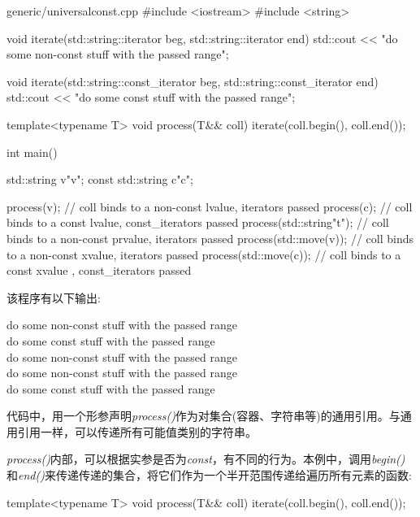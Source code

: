 \begin{codeboxt}[cpp]{generic/universalconst.cpp}
#include <iostream>
#include <string>

void iterate(std::string::iterator beg, std::string::iterator end)
{
  std::cout << "do some non-const stuff with the passed range\n";
}

void iterate(std::string::const_iterator beg, std::string::const_iterator end)
{
  std::cout << "do some const stuff with the passed range\n";
}

template<typename T>
void process(T&& coll)
{
  iterate(coll.begin(), coll.end());
}

int main()
{
  std::string v{"v"};
  const std::string c{"c"};

  process(v); // coll binds to a non-const lvalue, iterators passed
  process(c); // coll binds to a const lvalue, const_iterators passed
  process(std::string{"t"}); // coll binds to a non-const prvalue, iterators passed
  process(std::move(v)); // coll binds to a non-const xvalue, iterators passed
  process(std::move(c)); // coll binds to a const xvalue , const_iterators passed
}
\end{codeboxt}

该程序有以下输出:\par

\begin{myOutput}
do some non-const stuff with the passed range \\
do some const stuff with the passed range \\
do some non-const stuff with the passed range \\
do some non-const stuff with the passed range \\
do some const stuff with the passed range
\end{myOutput}

代码中，用一个形参声明\textit{process()}作为对集合(容器、字符串等)的通用引用。与通用引用一样，可以传递所有可能值类别的字符串。\par

\textit{process()}内部，可以根据实参是否为\textit{const}，有不同的行为。本例中，调用\textit{begin()}和\textit{end()}来传递传递的集合，将它们作为一个半开范围传递给遍历所有元素的函数:\par

\begin{codebox}[cpp]
  template<typename T>
  void process(T&& coll)
  {
    iterate(coll.begin(), coll.end());
  }
\end{codebox}

